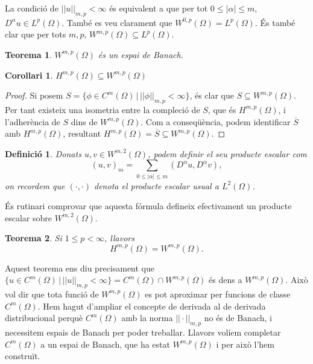 \documentclass{article}
\numberwithin{equation}{section}
\newtheorem{teorema}{Teorema}[section]
\newtheorem{corollari}{Corol\textperiodcentered lari}[section]
\newtheorem{definicio}{Definici\'{o}}[section]
\begin{document}
La condici\'{o} de $||u||_{m,p}<\infty$ \'{e}s equivalent a que per tot $0\leq|\alpha|\leq m$, $D^{\alpha}u\in L^p(\Omega)$. Tamb\'{e} es veu clarament que $W^{0,p}(\Omega)=L^p(\Omega)$. \'{E}s tamb\'{e} clar que per tots $m,p$, $W^{m,p}(\Omega)\subseteq L^p(\Omega)$.

\begin{teorema}
$W^{m,p}(\Omega)$ \'{e}s un espai de Banach.
\end{teorema}

\begin{corollari}
$H^{m,p}(\Omega)\subseteq W^{m,p}(\Omega)$
\end{corollari}
\begin{proof}
Si posem $S=\{\phi\in C^m(\Omega)\,|\,||\phi||_{m,p}<\infty\}$, \'{e}s clar que $S\subseteq W^{m,p}(\Omega)$. Per tant existeix una isometria entre la compleci\'{o} de $S$, que \'{e}s $H^{m,p}(\Omega)$, i l'adher\`{e}ncia de $S$ dins de $W^{m,p}(\Omega)$. Com a conseq\"{u}\`{e}ncia, podem identificar $\overline{S}$ amb $H^{m,p}(\Omega)$, resultant $H^{m,p}(\Omega)=\overline{S}\subseteq W^{m,p}(\Omega)$.
\end{proof}

\begin{definicio}
Donats $u,v\in W^{m,2}(\Omega)$, podem definir el seu producte escalar com
\[(u,v)_m=\sum_{0\leq|\alpha|\leq m}(D^{\alpha}u,D^{\alpha}v),\]
on recordem que $(\cdot,\cdot)$ denota el producte escalar usual a $L^2(\Omega)$.
\end{definicio}

\'{E}s rutinari comprovar que aquesta f\'{o}rmula defineix efectivament un producte escalar sobre $W^{m,2}(\Omega)$.

\begin{teorema}
Si $1\leq p<\infty$, llavors
\[H^{m,p}(\Omega)=W^{m,p}(\Omega).\]
\end{teorema}

Aquest teorema ens diu precisament que $\{u\in C^m(\Omega)\,|\,||u||_{m,p}<\infty\}=C^m(\Omega)\cap W^{m,p}(\Omega)$ \'{e}s dens a $W^{m,p}(\Omega)$. Aix\`{o} vol dir que tota funci\'{o} de $W^{m,p}(\Omega)$ es pot aproximar per funcions de classe $C^m(\Omega)$. Hem hagut d'ampliar el concepte de derivada al de derivada distribucional perqu\`{e} $C^m(\Omega)$ amb la norma $||\cdot||_{m,p}$ no \'{e}s de Banach, i necessitem espais de Banach per poder treballar. Llavors vol\'{i}em completar $C^m(\Omega)$ a un espai de Banach, que ha estat $W^{m,p}(\Omega)$ i per aix\`{o} l'hem constru\"{i}t.
\end{document}
